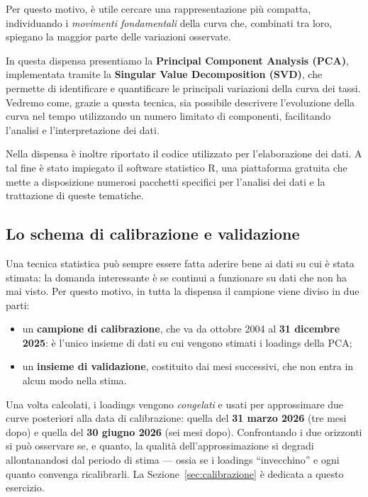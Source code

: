\documentclass[11pt,a4paper]{article}
\theoremstyle{plain}
\theoremstyle{definition}
\theoremstyle{remark}
\begin{document}
Per questo motivo, è utile cercare una rappresentazione più compatta, individuando i \emph{movimenti fondamentali} della curva che, combinati tra loro, spiegano la maggior parte delle variazioni osservate. 

In questa dispensa presentiamo la \textbf{Principal Component Analysis (PCA)}, implementata tramite la \textbf{Singular Value Decomposition (SVD)}, che permette di identificare e quantificare le principali variazioni della curva dei tassi. Vedremo come, grazie a questa tecnica, sia possibile descrivere l'evoluzione della curva nel tempo utilizzando un numero limitato di componenti, facilitando l'analisi e l'interpretazione dei dati.

Nella dispensa è inoltre riportato il codice utilizzato per l'elaborazione dei dati. A tal fine è stato impiegato il software statistico R, una piattaforma gratuita che mette a disposizione numerosi pacchetti specifici per l'analisi dei dati e la trattazione di queste tematiche.


\subsection{Lo schema di calibrazione e validazione}
\label{sec:calibrazione-validazione}

Una tecnica statistica può sempre essere fatta aderire bene ai dati su cui è
stata stimata: la domanda interessante è se continui a funzionare su dati che
non ha mai visto. Per questo motivo, in tutta la dispensa il campione viene
diviso in due parti:

\begin{itemize}
  \item un \textbf{campione di calibrazione}, che va da ottobre 2004 al
        \textbf{31 dicembre 2025}: è l'unico insieme di dati su cui vengono
        stimati i loadings della PCA;
  \item un \textbf{insieme di validazione}, costituito dai mesi successivi,
        che non entra in alcun modo nella stima.
\end{itemize}

Una volta calcolati, i loadings vengono \emph{congelati} e usati per
approssimare due curve posteriori alla data di calibrazione: quella del
\textbf{31 marzo 2026} (tre mesi dopo) e quella del \textbf{30 giugno 2026}
(sei mesi dopo). Confrontando i due orizzonti si può osservare se, e quanto,
la qualità dell'approssimazione si degradi allontanandosi dal periodo di
stima --- ossia se i loadings ``invecchino'' e ogni quanto convenga
ricalibrarli. La Sezione~\ref{sec:calibrazione} è dedicata a questo esercizio.
\end{document}
